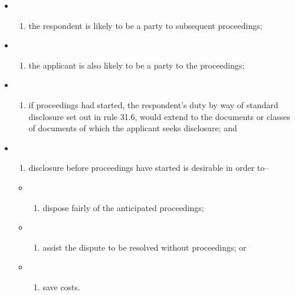 \documentclass[
]{article}
\providecommand{\tightlist}{%
  \setlength{\itemsep}{0pt}\setlength{\parskip}{0pt}}
\begin{document}
\begin{itemize}
\item
  \begin{enumerate}
  \def\labelenumi{(\alph{enumi})}
  \tightlist
  \item
    the respondent is likely to be a party to subsequent proceedings;
  \end{enumerate}
\item
  \begin{enumerate}
  \def\labelenumi{(\alph{enumi})}
  \setcounter{enumi}{1}
  \tightlist
  \item
    the applicant is also likely to be a party to the proceedings;
  \end{enumerate}
\item
  \begin{enumerate}
  \def\labelenumi{(\alph{enumi})}
  \setcounter{enumi}{2}
  \tightlist
  \item
    if proceedings had started, the respondent's duty by way of standard
    disclosure set out in rule 31.6, would extend to the documents or
    classes of documents of which the applicant seeks disclosure; and
  \end{enumerate}
\item
  \begin{enumerate}
  \def\labelenumi{(\alph{enumi})}
  \setcounter{enumi}{3}
  \tightlist
  \item
    disclosure before proceedings have started is desirable in order
    to--
  \end{enumerate}

  \begin{itemize}
  \item
    \begin{enumerate}
    \def\labelenumi{(\roman{enumi})}
    \tightlist
    \item
      dispose fairly of the anticipated proceedings;
    \end{enumerate}
  \item
    \begin{enumerate}
    \def\labelenumi{(\roman{enumi})}
    \setcounter{enumi}{1}
    \tightlist
    \item
      assist the dispute to be resolved without proceedings; or
    \end{enumerate}
  \item
    \begin{enumerate}
    \def\labelenumi{(\roman{enumi})}
    \setcounter{enumi}{2}
    \tightlist
    \item
      save costs.
    \end{enumerate}
  \end{itemize}
\end{itemize}
\end{document}

